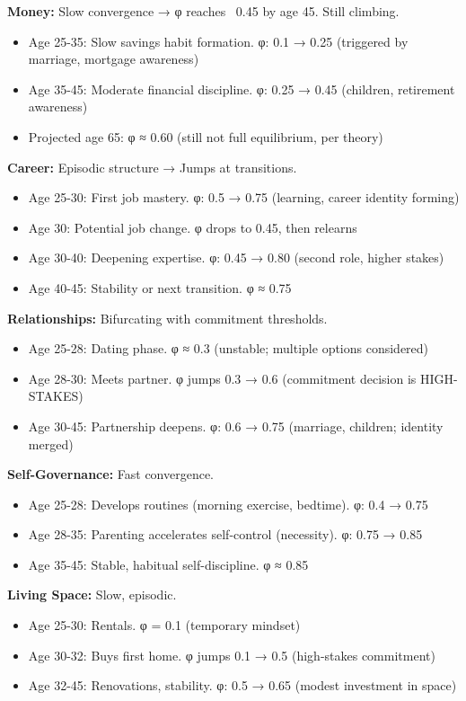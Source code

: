 {{\textbf{Money:} Slow convergence → φ reaches ~0.45 by age 45. Still climbing.
\begin{itemize}[nosep]
\item Age 25-35: Slow savings habit formation. φ: 0.1 → 0.25 (triggered by marriage, mortgage awareness)
\item Age 35-45: Moderate financial discipline. φ: 0.25 → 0.45 (children, retirement awareness)
\item Projected age 65: φ ≈ 0.60 (still not full equilibrium, per theory)
\end{itemize}

\textbf{Career:} Episodic structure → Jumps at transitions.
\begin{itemize}[nosep]
\item Age 25-30: First job mastery. φ: 0.5 → 0.75 (learning, career identity forming)
\item Age 30: Potential job change. φ drops to 0.45, then relearns
\item Age 30-40: Deepening expertise. φ: 0.45 → 0.80 (second role, higher stakes)
\item Age 40-45: Stability or next transition. φ ≈ 0.75
\end{itemize}

\textbf{Relationships:} Bifurcating with commitment thresholds.
\begin{itemize}[nosep]
\item Age 25-28: Dating phase. φ ≈ 0.3 (unstable; multiple options considered)
\item Age 28-30: Meets partner. φ jumps 0.3 → 0.6 (commitment decision is HIGH-STAKES)
\item Age 30-45: Partnership deepens. φ: 0.6 → 0.75 (marriage, children; identity merged)
\end{itemize}

\textbf{Self-Governance:} Fast convergence.
\begin{itemize}[nosep]
\item Age 25-28: Develops routines (morning exercise, bedtime). φ: 0.4 → 0.75
\item Age 28-35: Parenting accelerates self-control (necessity). φ: 0.75 → 0.85
\item Age 35-45: Stable, habitual self-discipline. φ ≈ 0.85
\end{itemize}

\textbf{Living Space:} Slow, episodic.
\begin{itemize}[nosep]
\item Age 25-30: Rentals. φ = 0.1 (temporary mindset)
\item Age 30-32: Buys first home. φ jumps 0.1 → 0.5 (high-stakes commitment)
\item Age 32-45: Renovations, stability. φ: 0.5 → 0.65 (modest investment in space)
\end{itemize}

}}
